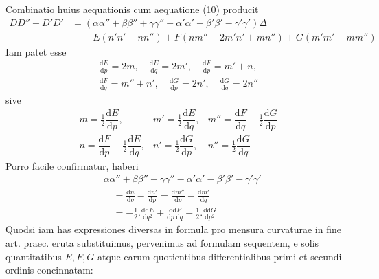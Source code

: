 \par\indent{}%
Combinatio huius aequationis cum aequatione (10) producit
\begingroup\fontsize{10}{12}\selectfont
\[
\begin{aligned}
DD''-D'D'&=(\alpha\alpha''+\beta\beta''+\gamma\gamma''-\alpha'\alpha'-\beta'\beta'-\gamma'\gamma')\Delta\\
&\quad+E(n'n'-nn'')+F(nm''-2m'n'+mn'')+G(m'm'-mm'')
\end{aligned}
\]
\endgroup
Iam patet esse
\[
\begin{gathered}
\frac{\mathrm{d}E}{\mathrm{d}p}=2m,\quad\frac{\mathrm{d}E}{\mathrm{d}q}=2m',\quad\frac{\mathrm{d}F}{\mathrm{d}p}=m'+n,\\
\frac{\mathrm{d}F}{\mathrm{d}q}=m''+n',\quad\frac{\mathrm{d}G}{\mathrm{d}p}=2n',\quad\frac{\mathrm{d}G}{\mathrm{d}q}=2n''
\end{gathered}
\]
sive
\[
\begin{array}{lll}
m=\tfrac{1}{2}\dfrac{\mathrm{d}E}{\mathrm{d}p},&m'=\tfrac{1}{2}\dfrac{\mathrm{d}E}{\mathrm{d}q},&m''=\dfrac{\mathrm{d}F}{\mathrm{d}q}-\tfrac{1}{2}\dfrac{\mathrm{d}G}{\mathrm{d}p}\\[6pt]
n=\dfrac{\mathrm{d}F}{\mathrm{d}p}-\tfrac{1}{2}\dfrac{\mathrm{d}E}{\mathrm{d}q},&n'=\tfrac{1}{2}\dfrac{\mathrm{d}G}{\mathrm{d}p},&n''=\tfrac{1}{2}\dfrac{\mathrm{d}G}{\mathrm{d}q}
\end{array}
\]
Porro facile confirmatur, haberi
\[
\begin{aligned}
&\alpha\alpha''+\beta\beta''+\gamma\gamma''-\alpha'\alpha'-\beta'\beta'-\gamma'\gamma'\\
&\quad=\frac{\mathrm{d}n}{\mathrm{d}q}-\frac{\mathrm{d}n'}{\mathrm{d}p}=\frac{\mathrm{d}m''}{\mathrm{d}p}-\frac{\mathrm{d}m'}{\mathrm{d}q}\\
&\quad=-\tfrac{1}{2}\mathord{.}\frac{\mathrm{d}\mathrm{d}E}{\mathrm{d}q^2}+\frac{\mathrm{d}\mathrm{d}F}{\mathrm{d}p\mathord{.}\mathrm{d}q}-\tfrac{1}{2}\mathord{.}\frac{\mathrm{d}\mathrm{d}G}{\mathrm{d}p^2}
\end{aligned}
\]
Quodsi iam has expressiones diversas in formula pro mensura curvaturae in fine art. praec. eruta substituimus, pervenimus ad formulam sequentem, e solis quantitatibus \(E,F,G\) atque earum quotientibus differentialibus primi et secundi ordinis concinnatam:
